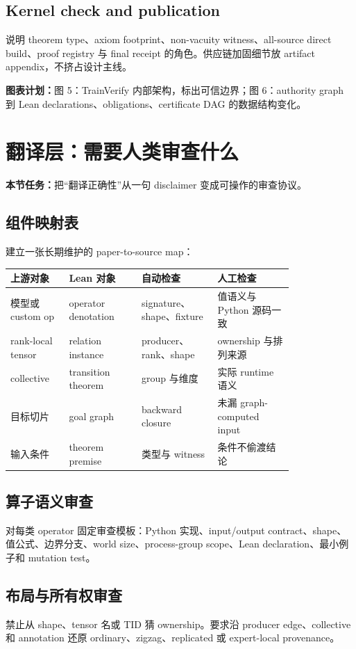 \documentclass[11pt,a4paper]{ctexart}
\newcommand{\contract}[1]{\par\smallskip\noindent\colorbox{light}{\parbox{0.95\linewidth}{\textbf{本节任务：}#1}}\par\smallskip}
\newcommand{\figplan}[1]{\par\noindent\textbf{图表计划：}#1\par}
\begin{document}
\subsection{Kernel check and publication}
说明 theorem type、axiom footprint、non-vacuity witness、all-source direct build、proof registry 与 final receipt 的角色。供应链加固细节放 artifact appendix，不挤占设计主线。

\figplan{图 5：TrainVerify 内部架构，标出可信边界；图 6：authority graph 到 Lean declarations、obligations、certificate DAG 的数据结构变化。}

\section{翻译层：需要人类审查什么}
\contract{把“翻译正确性”从一句 disclaimer 变成可操作的审查协议。}

\subsection{组件映射表}
建立一张长期维护的 paper-to-source map：
\begin{longtable}{p{0.16\linewidth}p{0.21\linewidth}p{0.22\linewidth}p{0.22\linewidth}}
\toprule
上游对象 & Lean 对象 & 自动检查 & 人工检查 \\
\midrule
模型或 custom op & operator denotation & signature、shape、fixture & 值语义与 Python 源码一致 \\
rank-local tensor & relation instance & producer、rank、shape & ownership 与排列来源 \\
collective & transition theorem & group 与维度 & 实际 runtime 语义 \\
目标切片 & goal graph & backward closure & 未漏 graph-computed input \\
输入条件 & theorem premise & 类型与 witness & 条件不偷渡结论 \\
\bottomrule
\end{longtable}

\subsection{算子语义审查}
对每类 operator 固定审查模板：Python 实现、input/output contract、shape、值公式、边界分支、world size、process-group scope、Lean declaration、最小例子和 mutation test。

\subsection{布局与所有权审查}
禁止从 shape、tensor 名或 TID 猜 ownership。要求沿 producer edge、collective 和 annotation 还原 ordinary、zigzag、replicated 或 expert-local provenance。
\end{document}
